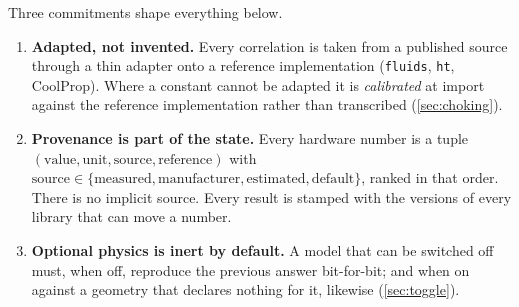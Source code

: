 \documentclass[11pt,a4paper]{article}
\newcommand{\code}[1]{\texttt{#1}}
\begin{document}
Three commitments shape everything below.

\begin{enumerate}[label=(C\arabic*)]
\item \textbf{Adapted, not invented.} Every correlation is taken from a
      published source through a thin adapter onto a reference implementation
      (\code{fluids}, \code{ht}, CoolProp). Where a constant cannot be adapted
      it is \emph{calibrated} at import against the reference implementation
      rather than transcribed (\cref{sec:choking}).
\item \textbf{Provenance is part of the state.} Every hardware number is a
      tuple $(\text{value}, \text{unit}, \text{source}, \text{reference})$ with
      $\text{source}\in\{\text{measured},\text{manufacturer},\text{estimated},\text{default}\}$,
      ranked in that order. There is no implicit source. Every result is
      stamped with the versions of every library that can move a number.
\item \textbf{Optional physics is inert by default.} A model that can be
      switched off must, when off, reproduce the previous answer bit-for-bit;
      and when on against a geometry that declares nothing for it, likewise
      (\cref{sec:toggle}).
\end{enumerate}

\end{document}
